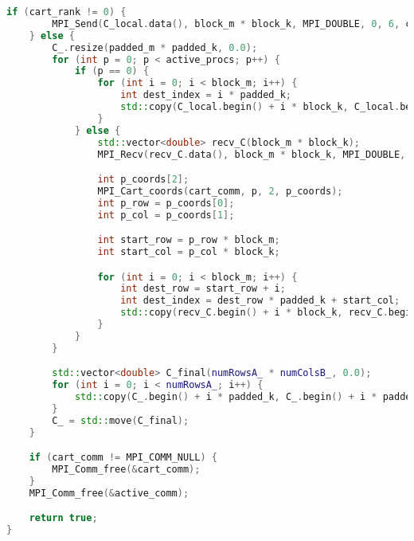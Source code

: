 \documentclass[12pt]{article}
\begin{document}
\begin{lstlisting}[language=C++]
    if (cart_rank != 0) {
        MPI_Send(C_local.data(), block_m * block_k, MPI_DOUBLE, 0, 6, cart_comm);
    } else {
        C_.resize(padded_m * padded_k, 0.0);
        for (int p = 0; p < active_procs; p++) {
            if (p == 0) {
                for (int i = 0; i < block_m; i++) {
                    int dest_index = i * padded_k;
                    std::copy(C_local.begin() + i * block_k, C_local.begin() + (i + 1) * block_k, C_.begin() + dest_index);
                }
            } else {
                std::vector<double> recv_C(block_m * block_k);
                MPI_Recv(recv_C.data(), block_m * block_k, MPI_DOUBLE, p, 6, cart_comm, MPI_STATUS_IGNORE);

                int p_coords[2];
                MPI_Cart_coords(cart_comm, p, 2, p_coords);
                int p_row = p_coords[0];
                int p_col = p_coords[1];

                int start_row = p_row * block_m;
                int start_col = p_col * block_k;

                for (int i = 0; i < block_m; i++) {
                    int dest_row = start_row + i;
                    int dest_index = dest_row * padded_k + start_col;
                    std::copy(recv_C.begin() + i * block_k, recv_C.begin() + (i + 1) * block_k, C_.begin() + dest_index);
                }
            }
        }

        std::vector<double> C_final(numRowsA_ * numColsB_, 0.0);
        for (int i = 0; i < numRowsA_; i++) {
            std::copy(C_.begin() + i * padded_k, C_.begin() + i * padded_k + numColsB_, C_final.begin() + i * numColsB_);
        }
        C_ = std::move(C_final);
    }

    if (cart_comm != MPI_COMM_NULL) {
        MPI_Comm_free(&cart_comm);
    }
    MPI_Comm_free(&active_comm);

    return true;
}
\end{lstlisting}
\end{document}
